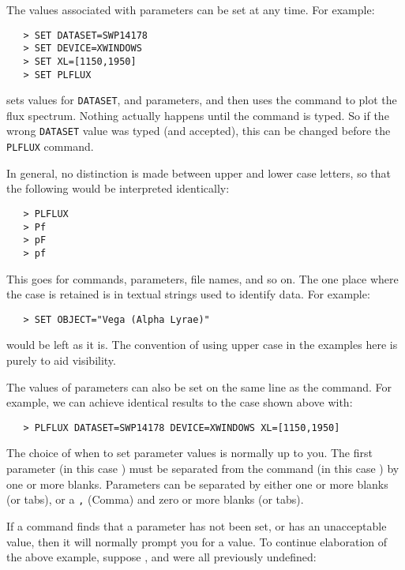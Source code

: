 The values associated with parameters can be set at any time.  For example:

\begin{verbatim}
   > SET DATASET=SWP14178
   > SET DEVICE=XWINDOWS
   > SET XL=[1150,1950]
   > SET PLFLUX
\end{verbatim}

sets values for \verb+DATASET+, 
 and 
 parameters, and
then uses the 
 command to plot the flux spectrum.  Nothing actually
happens until the 
 command is typed.  So if the wrong \verb+DATASET+
value was typed (and accepted), this can be changed before the \verb+PLFLUX+
command.

In general, no distinction is made between upper and lower case letters, so
that the following would be interpreted identically:

\begin{verbatim}
   > PLFLUX
   > Pf
   > pF
   > pf
\end{verbatim}

This goes for commands, parameters, file names, and so on.  The one place
where the case is retained is in textual strings used to identify data.
For example:

\begin{verbatim}
   > SET OBJECT="Vega (Alpha Lyrae)"
\end{verbatim}

would be left as it is.  The convention of using upper case in the examples
here is purely to aid visibility.

The values of parameters can also be set on the same line as the command.
For example, we can achieve identical results to the case shown above with:

\begin{verbatim}
   > PLFLUX DATASET=SWP14178 DEVICE=XWINDOWS XL=[1150,1950]
\end{verbatim}

The choice of when to set parameter values is normally up to you.  The first
parameter (in this case 
) must be separated from the command (in
this case 
) by one or more blanks.  Parameters can be separated by
either one or more blanks (or tabs), or a \verb+,+ (Comma) and zero or more
blanks (or tabs)\@.

If a command finds that a parameter has not been set, or has an unacceptable
value, then it will normally prompt you for a value.  To continue elaboration
of the above example, suppose ,
 and 
 were
all previously undefined:

